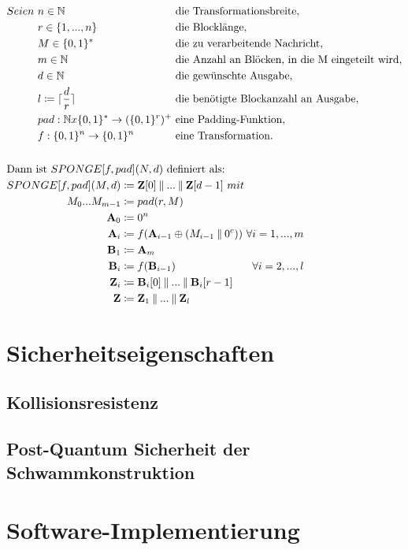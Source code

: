 	\begin{align*}
		&\begin{alignedat}[t]{2}
			Seien\ & n \in \mathbb{N} && \text{ die Transformationsbreite}, \\
			& r \in \{1,...,n\} && \text{ die Blocklänge}, \\
			& M \in \{0,1\}^* && \text{ die zu verarbeitende Nachricht}, \\
			& m \in \mathbb{N} && \text{ die Anzahl an Blöcken, in die M eingeteilt wird}, \\
			& d \in \mathbb{N} && \text{ die gewünschte Ausgabe}, \\
			& l \coloneq \lceil \frac{d}{r} \rceil && \text{ die benötigte Blockanzahl an Ausgabe}, \\
			& pad: \mathbb{N}x\{0,1\}^* \to (\{0,1\}^r)^+ && \text{ eine Padding-Funktion}, \\
			& f: \{0,1\}^n \to \{0,1\}^n && \text{ eine Transformation}.
		\end{alignedat} \\
		\\
		&\text{Dann ist } SPONGE[f,pad](N,d)\ \text{definiert als:} \\
		&\begin{alignedat}[t]{3}
			SPONGE[f,pad](M, d) & \coloneq \mathbf{Z}[0] \mathbin\Vert ... \mathbin\Vert \mathbf{Z}[d-1]\ mit \\
			M_0...M_{m-1} & \coloneq pad(r, M) \\
			\mathbf{A}_0 & \coloneq 0^n \\
			\mathbf{A}_i & \coloneq f(\mathbf{A}_{i-1} \oplus (M_{i-1} \mathbin\Vert 0^c))\ & \forall i = 1,...,m \\
			\mathbf{B}_1 & \coloneq \mathbf{A}_{m} \\
			\mathbf{B}_i & \coloneq f(\mathbf{B}_{i-1})\ & \forall i = 2,...,l \\
			\mathbf{Z}_i & \coloneq \mathbf{B}_i[0] \mathbin\Vert ... \mathbin\Vert \mathbf{B}_i[r-1] \\
			\mathbf{Z} & \coloneq \mathbf{Z}_1 \mathbin\Vert ... \mathbin\Vert \mathbf{Z}_l
		\end{alignedat}
	\end{align*}

\section{Sicherheitseigenschaften}

\subsection{Kollisionsresistenz}

\subsection{Post-Quantum Sicherheit der Schwammkonstruktion}

\section{Software-Implementierung}